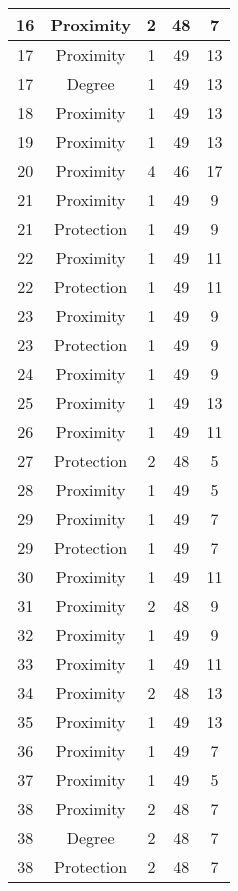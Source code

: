 \documentclass[results.tex]{subfiles}
\begin{document}
\begin{center}
\begin{tabular}{| c || c | c | c | c |}
    \hline
    16 & Proximity & 2 & 48 & 7 \\ 
    \hline
    17 & Proximity & 1 & 49 & 13 \\ 
    \hline
    17 & Degree & 1 & 49 & 13 \\ 
    \hline
    18 & Proximity & 1 & 49 & 13 \\ 
    \hline
    19 & Proximity & 1 & 49 & 13 \\ 
    \hline
    20 & Proximity & 4 & 46 & 17 \\ 
    \hline
    21 & Proximity & 1 & 49 & 9 \\ 
    \hline
    21 & Protection & 1 & 49 & 9 \\ 
    \hline
    22 & Proximity & 1 & 49 & 11 \\ 
    \hline
    22 & Protection & 1 & 49 & 11 \\ 
    \hline
    23 & Proximity & 1 & 49 & 9 \\ 
    \hline
    23 & Protection & 1 & 49 & 9 \\ 
    \hline
    24 & Proximity & 1 & 49 & 9 \\ 
    \hline
    25 & Proximity & 1 & 49 & 13 \\ 
    \hline
    26 & Proximity & 1 & 49 & 11 \\ 
    \hline
    27 & Protection & 2 & 48 & 5 \\ 
    \hline
    28 & Proximity & 1 & 49 & 5 \\ 
    \hline
    29 & Proximity & 1 & 49 & 7 \\ 
    \hline
    29 & Protection & 1 & 49 & 7 \\ 
    \hline
    30 & Proximity & 1 & 49 & 11 \\ 
    \hline
    31 & Proximity & 2 & 48 & 9 \\ 
    \hline
    32 & Proximity & 1 & 49 & 9 \\ 
    \hline
    33 & Proximity & 1 & 49 & 11 \\ 
    \hline
    34 & Proximity & 2 & 48 & 13 \\ 
    \hline
    35 & Proximity & 1 & 49 & 13 \\ 
    \hline
    36 & Proximity & 1 & 49 & 7 \\ 
    \hline
    37 & Proximity & 1 & 49 & 5 \\ 
    \hline
    38 & Proximity & 2 & 48 & 7 \\ 
    \hline
    38 & Degree & 2 & 48 & 7 \\ 
    \hline
    38 & Protection & 2 & 48 & 7 \\ 

\end{tabular}
\end{center}
\end{document}
